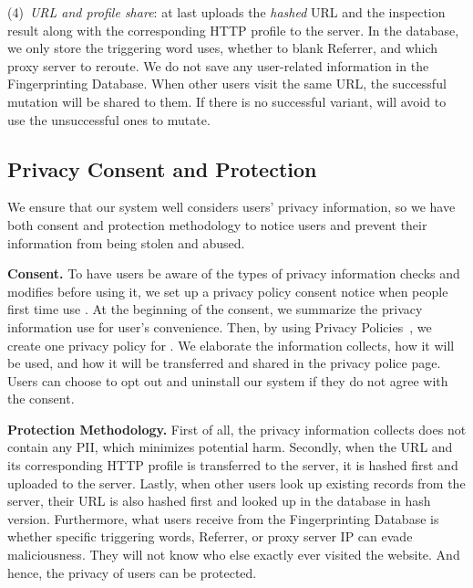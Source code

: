 (4)~\emph{URL and profile share}:
\spartacus at last uploads the \emph{hashed} URL and the inspection result along with the corresponding HTTP profile to the server.
In the database, we only store 
the triggering word \spartacus uses, whether to blank Referrer, and which proxy server to reroute.
We do not save any user-related information in the Fingerprinting Database.
When other users visit the same URL, the successful mutation will be shared to them.
If there is no successful variant, \spartacus will avoid to use the unsuccessful ones to mutate.


\subsection{Privacy Consent and Protection}

We ensure that our \spartacus system well considers users' privacy information,
so we have both consent and protection methodology to notice users and prevent their information from being stolen and abused.

\noindent
\textbf{Consent.}
To have users be aware of the types of privacy information \spartacus checks and modifies before using it,
we set up a privacy policy consent notice when people first time use \spartacus.
At the beginning of the consent, we summarize the privacy information \spartacus use for user's convenience.
Then, by using Privacy Policies~\cite{privacypolicy}, we create one privacy policy for \spartacus.
We elaborate the information \spartacus collects, how it will be used, and how it will be transferred and shared in the privacy police page.
Users can choose to opt out and uninstall our system if they do not agree with the consent.

\noindent
\textbf{Protection Methodology.}
First of all, the privacy information \spartacus collects does not contain any PII, which minimizes potential harm.
Secondly, when the URL and its corresponding HTTP profile is transferred to the server,
it is hashed first and uploaded to the server.
Lastly, when other users look up existing records from the server,
their URL is also hashed first and looked up in the database in hash version.
Furthermore, what users receive from the Fingerprinting Database is whether specific triggering words, Referrer, or proxy server IP can evade maliciousness.
They will not know who else exactly ever visited the website.
And hence, the privacy of users can be protected.